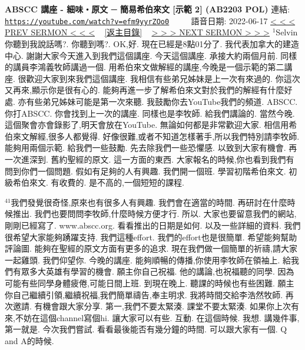\documentclass{book}
\begin{document}
\section{}
\label{sec:efm9yyrZOo0}
\textbf{ABSCC 講座 - 細味‧原文 ─ 簡易希伯來文 [示範 2] (AB2203 POL)}
\newline
\newline
連結: \href{https://youtube.com/watch?v=efm9yyrZOo0}{\texttt{https://youtube.com/watch?v=efm9yyrZOo0}} ~~~~ 語音日期: 2022-06-17
\newline
\newline
\hyperref[sec:L8_DVqUvOSM]{\small{< < < PREV SERMON < < <}}
~
\hyperref[sec:index]{\small{[返主目錄]}}
~
\hyperref[sec:3o4omcoTUB4]{\small{> > > NEXT SERMON > > >}}
\newline
\newline
$^{1}$Selvin你聽到我說話嗎?.
你聽到嗎?.
OK,好.
現在已經是8點01分了.
我代表加拿大的建造中心.
謝謝大家今天進入到我們這個講座.
今天這個講座.
承接大約兩個月前.
同樣的講員李鴻義牧師講過一個.
用希伯來文做解經的講座,今晚是一個示範的第二講座.
很歡迎大家到來我們這個講座.
我相信有些弟兄姊妹是上一次有來過的.
你這次又再來,顯示你是很有心的.
能夠再進一步了解希伯來文對於我們的解經有什麼好處.
亦有些弟兄姊妹可能是第一次來聽.
我鼓勵你去YouTube我們的頻道.
ABSCC.
你打ABSCC.
你會找到上一次的講座.
同樣也是李牧師.
給我們講論的.
當然今晚.
這個聚會亦會錄影了,明天會放在YouTube.
無論如何都是非常歡迎大家.
相信用希伯來文解經,很多人都覺得.
好像很難,或者不知道怎樣著手,所以我們特別請李牧師.
能夠用兩個示範.
給我們一些鼓勵.
先去除我們一些恐懼感.
以致到大家有機會.
再一次進深到.
舊約聖經的原文.
這一方面的東西.
大家報名的時候,你也看到我們有問到你們一個問題.
假如有足夠的人有興趣.
我們開一個班.
學習初階希伯來文.
初級希伯來文.
有收費的.
是不高的,一個短短的課程.

$^{41}$我們發覺很奇怪,原來也有很多人有興趣.
我們會在適當的時間.
再研討在什麼時候推出.
我們也要問問李牧師,什麼時候方便才行.
所以.
大家也要留意我們的網站,剛剛已經寫了.
www.abscc.org.
看看推出的日期是如何.
以及一些詳細的資料.
我們很希望大家能夠踴躍支持.
我們這種effort.
我們的effort也是很簡單.
希望能夠幫助評論圖.
能夠在聖經的原文方面有更多的追求.
現在我們做一個簡單的祈禱,請大家一起雞頭.
我們仰望你.
今晚的講座.
能夠順暢的傳播,你使用李牧師在領袖上.
給我們有眾多大英雄有學習的機會.
願主你自己祝福.
他的講論,也祝福聽的同學.
因為可能有些同學身體疲倦,可能日間上班.
到現在晚上.
聽課的時候也有些困難.
願主你自己繼續引領,繼續祝福,我們簡單禱告,奉主明求.
我將時間交給李浩然牧師.
再次邀請.
有機會跟大家分享.
第一,我們不要太緊湊.
課堂不要太緊湊.
如果你上次有來,不妨在這個channel寫個hi.
讓大家可以有些.
互動.
在這個時候.
我想.
講幾件事,第一就是.
今次我們嘗試.
看看最後能否有幾分鐘的時間.
可以跟大家有一個.
Q and A的時候.
\end{document}
